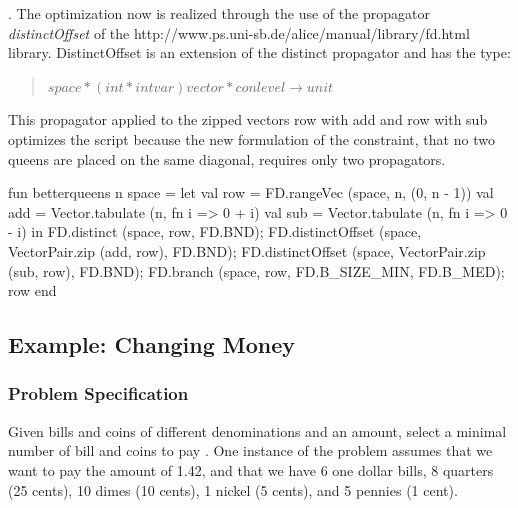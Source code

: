 \documentclass[a4paper,halfparskip]{scrartcl}
\begin{document}
.
The optimization now is realized through the use
of the propagator \emph{distinctOffset} of the 
\htmladdnormallink{\textcolor{blue}{\it FD}}
{http://www.ps.uni-sb.de/alice/manual/library/fd.html}
library. DistinctOffset is an extension
of the distinct propagator and has the type:
\begin{quote}
$ space * (int * intvar) vector * conlevel \rightarrow  unit $
\end{quote}
 
This propagator applied to the zipped vectors row with add and row with sub optimizes
the script because the new formulation of the constraint, that no two
queens are placed on the same diagonal, requires only two propagators.
\begin{myverbatim}
fun betterqueens n space =
  let
    val row = FD.rangeVec (space, n, (0, n - 1))
    val add = Vector.tabulate (n, fn i => 0 + i)
    val sub = Vector.tabulate (n, fn i => 0 - i)
  in
    FD.distinct (space, row, FD.BND);
    FD.distinctOffset (space, VectorPair.zip (add, row), FD.BND);
    FD.distinctOffset (space, VectorPair.zip (sub, row), FD.BND);
    FD.branch (space, row, FD.B_SIZE_MIN, FD.B_MED);
    row
  end
\end{myverbatim}


\newpage
\subsection{Example: Changing Money}
\subsubsection{Problem Specification}
Given bills and coins of different denominations and an amount, 
select a minimal number of bill and coins to pay . One instance of the 
problem assumes that we want to pay the amount of 1.42, and that we have 
6 one dollar bills, 8 quarters (25 cents), 10 dimes (10 cents), 1 nickel 
(5 cents), and 5 pennies (1 cent). 
\end{document}
